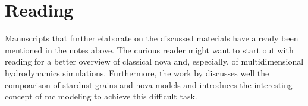 \section{Reading}

Manuscripts that further elaborate on the discussed materials have already been mentioned in the notes above. The curious reader might want to start out with reading \citet{jose12} for a better overview of classical nova and, especially, of multidimensional hydrodynamics simulations. Furthermore, the work by \citet{iliadis18} discusses well the compoarison of stardust grains and nova models and introduces the interesting concept of \ac{mc} modeling to achieve this difficult task.